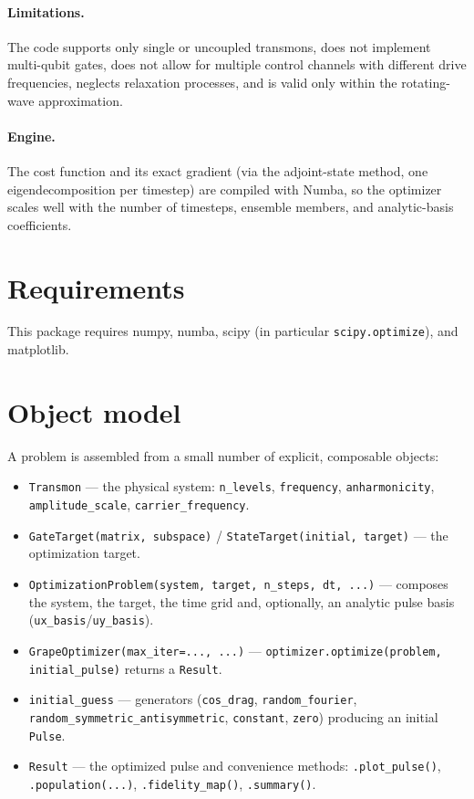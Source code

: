 \documentclass[a4paper,12pt]{article}
\newcommand{\mcode}[1]{\protect\lstinline[basicstyle=\color{black}\ttfamily]!#1!}
\begin{document}
\paragraph*{Limitations.} The code supports only single or uncoupled
transmons, does not implement multi-qubit gates, does not allow for multiple
control channels with different drive frequencies, neglects relaxation
processes, and is valid only within the rotating-wave approximation.

\paragraph*{Engine.} The cost function and its exact gradient (via the
adjoint-state method, one eigendecomposition per timestep) are compiled with
Numba, so the optimizer scales well with the number of timesteps, ensemble
members, and analytic-basis coefficients.

\section*{Requirements}
{}
This package requires numpy, numba, scipy (in particular
\mcode{scipy.optimize}), and matplotlib.

\section*{Object model}
{}
A problem is assembled from a small number of explicit, composable objects:
\begin{itemize}
    \item \mcode{Transmon} --- the physical system: \mcode{n_levels}, \mcode{frequency}, \mcode{anharmonicity}, \mcode{amplitude_scale}, \mcode{carrier_frequency}.
    \item \mcode{GateTarget(matrix, subspace)} / \mcode{StateTarget(initial, target)} --- the optimization target.
    \item \mcode{OptimizationProblem(system, target, n_steps, dt, ...)} --- composes the system, the target, the time grid and, optionally, an analytic pulse basis (\mcode{ux_basis}/\mcode{uy_basis}).
    \item \mcode{GrapeOptimizer(max_iter=..., ...)} --- \mcode{optimizer.optimize(problem, initial_pulse)} returns a \mcode{Result}.
    \item \mcode{initial_guess} --- generators (\mcode{cos_drag}, \mcode{random_fourier}, \mcode{random_symmetric_antisymmetric}, \mcode{constant}, \mcode{zero}) producing an initial \mcode{Pulse}.
    \item \mcode{Result} --- the optimized pulse and convenience methods: \mcode{.plot_pulse()}, \mcode{.population(...)}, \mcode{.fidelity_map()}, \mcode{.summary()}.
\end{itemize}
\end{document}
